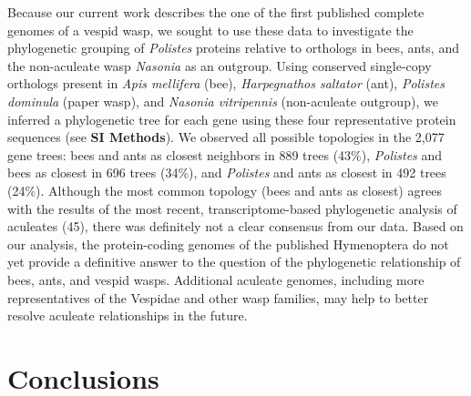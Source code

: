 Because our current work describes the one of the first published
complete genomes of a vespid wasp, we sought to use these data to
investigate the phylogenetic grouping of \textit{Polistes} proteins
relative to orthologs in bees, ants, and the non-aculeate wasp
\textit{Nasonia} as an outgroup. Using conserved single-copy orthologs
present in \textit{Apis mellifera} (bee), \textit{Harpegnathos saltator}
(ant), \textit{Polistes dominula} (paper wasp), and \textit{Nasonia
vitripennis} (non-aculeate outgroup), we inferred a phylogenetic tree
for each gene using these four representative protein sequences (see
\textbf{SI Methods}). We observed all possible topologies in the 2,077
gene trees: bees and ants as closest neighbors in 889 trees (43\%),
\textit{Polistes} and bees as closest in 696 trees (34\%), and
\textit{Polistes} and ants as closest in 492 trees (24\%). Although the
most common topology (bees and ants as closest) agrees with the results
of the most recent, transcriptome-based phylogenetic analysis of
aculeates (45), there was definitely not a clear consensus from our
data. Based on our analysis, the protein-coding genomes of the published
Hymenoptera do not yet provide a definitive answer to the question of
the phylogenetic relationship of bees, ants, and vespid wasps.
Additional aculeate genomes, including more representatives of the
Vespidae \cite{JandtToth2015} and
other wasp families, may help to better resolve aculeate relationships
in the future.

\section{Conclusions}

